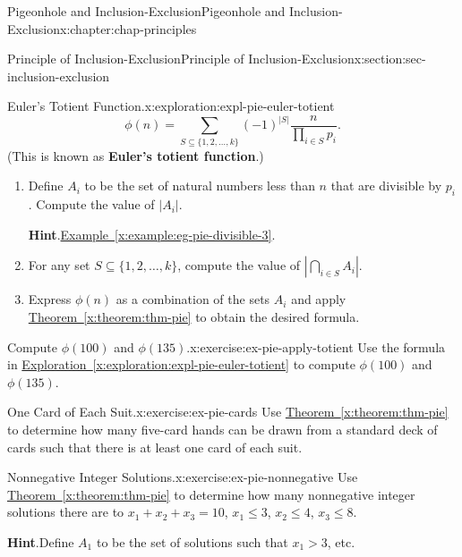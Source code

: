 \documentclass[oneside,10pt,]{book}
\newcommand{\blocktitlefont}{\relax}
\newcommand{\xreffont}{\relax}
\newcommand{\terminology}[1]{\textbf{#1}}
\numberwithin{equation}{section}
\begin{document}
\begin{chapterptx}{Pigeonhole and Inclusion-Exclusion}{}{Pigeonhole and Inclusion-Exclusion}{}{}{x:chapter:chap-principles}
\begin{sectionptx}{Principle of Inclusion-Exclusion}{}{Principle of Inclusion-Exclusion}{}{}{x:section:sec-inclusion-exclusion}
\begin{exploration}{Euler's Totient Function.}{x:exploration:expl-pie-euler-totient}
\begin{equation*}
\phi(n) = \sum_{S \subseteq \{1,2,\ldots,k\}}(-1)^{|S|}\dfrac{n}{\prod_{i\in S} p_i}\text{.}
\end{equation*}
(This is known as \terminology{Euler's totient function}.)%
\begin{enumerate}[font=\bfseries,label=(\alph*),ref=\alph*]
\item{}Define \(A_i\) to be the set of natural numbers less than \(n\) that are divisible by \(p_i\). Compute the value of \(|A_i|\).%
\par\smallskip%
\noindent\textbf{\blocktitlefont Hint}.\hypertarget{g:hint:id464654}{}\quad{}\hyperref[x:example:eg-pie-divisible-3]{Example~{\xreffont\ref{x:example:eg-pie-divisible-3}}}.%
\item{}For any set \(S \subseteq \{1,2,\ldots,k\}\), compute the value of \(\left|\displaystyle\bigcap_{i\in S} A_i \right|\).%
\item{}Express \(\phi(n)\) as a combination of the sets \(A_i\) and apply \hyperref[x:theorem:thm-pie]{Theorem~{\xreffont\ref{x:theorem:thm-pie}}} to obtain the desired formula.%
\end{enumerate}
\end{exploration}
\begin{inlineexercise}{Compute \(\phi(100)\) and \(\phi(135)\).}{x:exercise:ex-pie-apply-totient}%
Use the formula in \hyperref[x:exploration:expl-pie-euler-totient]{Exploration~{\xreffont\ref{x:exploration:expl-pie-euler-totient}}} to compute \(\phi(100)\) and \(\phi(135)\).%
\end{inlineexercise}
\begin{inlineexercise}{One Card of Each Suit.}{x:exercise:ex-pie-cards}%
Use \hyperref[x:theorem:thm-pie]{Theorem~{\xreffont\ref{x:theorem:thm-pie}}} to determine how many five-card hands can be drawn from a standard deck of cards such that there is at least one card of each suit.%
\end{inlineexercise}
\begin{inlineexercise}{Nonnegative Integer Solutions.}{x:exercise:ex-pie-nonnegative}%
Use \hyperref[x:theorem:thm-pie]{Theorem~{\xreffont\ref{x:theorem:thm-pie}}} to determine how many nonnegative integer solutions there are to \(x_1 + x_2 + x_3 = 10\), \(x_1 \leq 3\), \(x_2 \leq 4\), \(x_3 \leq 8\).%
\par\smallskip%
\noindent\textbf{\blocktitlefont Hint}.\hypertarget{g:hint:id465168}{}\quad{}Define \(A_1\) to be the set of solutions such that \(x_1 > 3\), etc.%
\end{inlineexercise}
\end{sectionptx}

\end{chapterptx}
\end{document}
